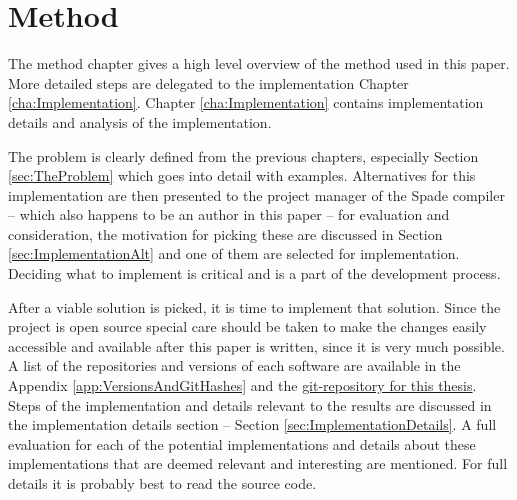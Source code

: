 \documentclass[msc,lith,english]{liuthesis}
\begin{document}
\cite{src:HLSandOpt}




\chapter{Method}
The method chapter gives a high level overview of the method used in this paper. More detailed steps are delegated to the implementation Chapter \ref{cha:Implementation}. Chapter \ref{cha:Implementation} contains implementation details and analysis of the implementation.

The problem is clearly defined from the previous chapters, especially Section \ref{sec:TheProblem} which goes into detail with examples. Alternatives for this implementation are then presented to the project manager of the Spade compiler -- which also happens to be an author in this paper -- for evaluation and consideration, the motivation for picking these are discussed in Section \ref{sec:ImplementationAlt} and one of them are selected for implementation. Deciding what to implement is critical and is a part of the development process.

After a viable solution is picked, it is time to implement that solution. Since the project is open source special care should be taken to make the changes easily accessible and available after this paper is written, since it is very much possible. A list of the repositories and versions of each software are available in the Appendix \ref{app:VersionsAndGitHashes} and the \href{https://github.com/FredTheDino/thesis-spade-lang}{git-repository for this thesis}. Steps of the implementation and details relevant to the results are discussed in the implementation details section -- Section \ref{sec:ImplementationDetails}. A full evaluation for each of the potential implementations and details about these implementations that are deemed relevant and interesting are mentioned. For full details it is probably best to read the source code. 
\end{document}
